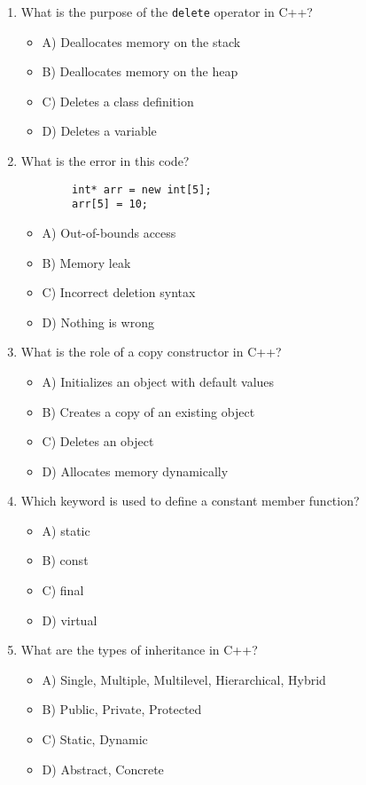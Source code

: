 \documentclass[a4paper,12pt]{article}
\begin{document}
\begin{enumerate}
    \item What is the purpose of the \verb|delete| operator in C++?
    \begin{itemize}
        \item A) Deallocates memory on the stack
        \item B) Deallocates memory on the heap
        \item C) Deletes a class definition
        \item D) Deletes a variable
    \end{itemize}

    \item What is the error in this code?

    \lstset{language=C++}
    \begin{lstlisting}
        int* arr = new int[5];
        arr[5] = 10;
    \end{lstlisting}
    
    \begin{itemize}
        \item A) Out-of-bounds access
        \item B) Memory leak
        \item C) Incorrect deletion syntax
        \item D) Nothing is wrong
    \end{itemize}

    \item What is the role of a copy constructor in C++?
    \begin{itemize}
        \item A) Initializes an object with default values
        \item B) Creates a copy of an existing object
        \item C) Deletes an object
        \item D) Allocates memory dynamically
    \end{itemize}

    \item Which keyword is used to define a constant member function?
    \begin{itemize}
        \item A) static
        \item B) const
        \item C) final
        \item D) virtual
    \end{itemize}

    \item What are the types of inheritance in C++?
    \begin{itemize}
        \item A) Single, Multiple, Multilevel, Hierarchical, Hybrid
        \item B) Public, Private, Protected
        \item C) Static, Dynamic
        \item D) Abstract, Concrete
    \end{itemize}


\end{enumerate}
\end{document}
